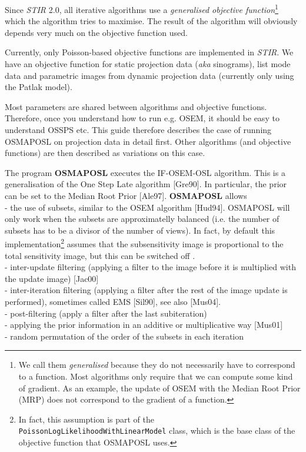 \documentclass{article}
\newcommand{\tab}{\hspace{5mm}}
\begin{document}
Since \textit{STIR} 2.0, all iterative algorithms use a \textit{generalised objective 
function}\footnote{We call them \textit{generalised} because they do not
necessarily have to correspond to a function. Most algorithms only require
that we can compute some kind of gradient. As an example, the update
of OSEM with the Median Root Prior (MRP) does not correspond to the
gradient of a function.} which the algorithm tries to maximise. The result
of the algorithm will obviously depends very much on the objective function
used.

Currently, only Poisson-based objective functions are implemented in \textit{STIR}. We
have an objective function for static projection data (\textit{aka} sinograms),
list mode data and parametric images from dynamic projection data 
(currently only using the Patlak model).

Most parameters are shared between algorithms and objective functions. Therefore,
once you understand how to run e.g. OSEM, it should be easy to understand OSSPS etc.
This guide therefore describes the case of running OSMAPOSL on projection data in detail
first. Other algorithms (and objective functions) are then described as variations on this
case.

{ 
}
\label{sec:OSMAPOSL}

The program \textbf{OSMAPOSL} executes the IF-OSEM-OSL algorithm. 
This is a generalisation of the One Step Late algorithm [Gre90]. In 
particular, the prior can be set to the Median Root Prior [Ale97]. \textbf{OSMAPOSL} 
allows \\
-\tab 
the use of subsets, similar to the OSEM algorithm [Hud94]. OSMAPOSL
will only work when the subsets are approximatelly balanced (i.e.
the number of subsets has to be a divisor of the number of views).
In fact, by default this implementation\footnote{In fact, this assumption
is part of the \texttt{PoissonLogLikelihoodWithLinearModel} class, which is
the base class of the objective function that OSMAPOSL uses.} assumes that the 
subsensitivity image is proportional to the total sensitivity image,
but this can be switched off .\\
-\tab 
inter-update filtering (applying a filter to the image before 
it is multiplied with the update image) [Jac00]\\
-\tab 
inter-iteration filtering (applying a filter after the rest of 
the image update is performed), sometimes called EMS [Sil90], 
see also [Mus04].\\
-\tab 
post-filtering (apply a filter after the last subiteration)\\
-\tab 
applying the prior information in an additive or multiplicative 
way [Mus01]\\
-\tab 
random permutation of the order of the subsets in each iteration
\end{document}

